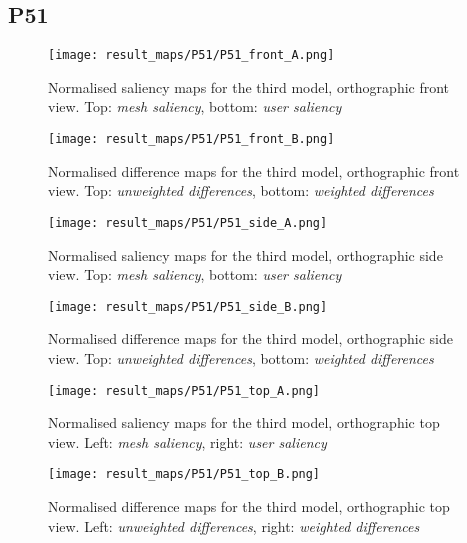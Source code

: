 \FloatBarrier
		\subsection{P51}
		\label{sec:results_p51}
%
%
\begin{figure}[!htb]
	\centering
	\texttt{[image: result\_maps/P51/P51\_front\_A.png]}\\ %
	\caption{Normalised saliency maps for the third model, orthographic front view. Top: \textit{mesh saliency}, bottom: \textit{user saliency}}
	\label{fig:results_p51_front_a}
\end{figure}
\begin{figure}[!htb]
	\centering
	\texttt{[image: result\_maps/P51/P51\_front\_B.png]}\\ %
	\caption{Normalised difference maps for the third model, orthographic front view. Top: \textit{unweighted differences}, bottom: \textit{weighted differences}}
	\label{fig:results_p51_front_b}
\end{figure}

\begin{figure}[!htb]
	\centering
	\texttt{[image: result\_maps/P51/P51\_side\_A.png]}\\ %
	\caption{Normalised saliency maps for the third model, orthographic side view. Top: \textit{mesh saliency}, bottom: \textit{user saliency}}
	\label{fig:results_p51_side_a}
\end{figure}
\begin{figure}[!htb]
	\centering
	\texttt{[image: result\_maps/P51/P51\_side\_B.png]}\\ %
	\caption{Normalised difference maps for the third model, orthographic side view. Top: \textit{unweighted differences}, bottom: \textit{weighted differences}}
	\label{fig:results_p51_side_b}
\end{figure}

\begin{figure}[!htb]
	\centering
	\texttt{[image: result\_maps/P51/P51\_top\_A.png]}\\ %
	\caption{Normalised saliency maps for the third model, orthographic top view. Left: \textit{mesh saliency}, right: \textit{user saliency}}
	\label{fig:results_p51_top_a}
\end{figure}
\begin{figure}[!htb]
	\centering
	\texttt{[image: result\_maps/P51/P51\_top\_B.png]}\\ %
	\caption{Normalised difference maps for the third model, orthographic top view. Left: \textit{unweighted differences}, right: \textit{weighted differences}}
	\label{fig:results_p51_top_b}
\end{figure}
%
%
\FloatBarrier

